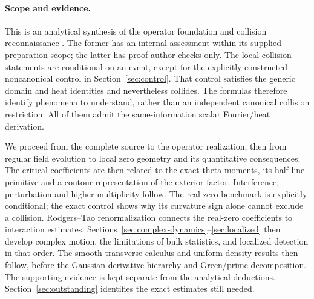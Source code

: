 \paragraph{Scope and evidence.}
This is an analytical synthesis of the operator foundation
\cite{OperatorProof,OperatorAssessment} and collision reconnaissance
\cite{OperatorCollision}. The former has an internal assessment within
its supplied-preparation scope; the latter has proof-author checks only.
The local collision statements are conditional on an event, except for
the explicitly constructed noncanonical control in Section~\ref{sec:control}.
That control satisfies the generic domain and heat identities and
nevertheless collides. The formulas therefore identify phenomena to
understand, rather than an independent canonical collision restriction.
All of them admit the same-information scalar Fourier/heat derivation.

We proceed from the complete source to the operator realization, then
from regular field evolution to local zero geometry and its quantitative
consequences. The critical coefficients are then related to the exact theta moments,
its half-line primitive and a contour representation of the exterior
factor. Interference, perturbation and higher multiplicity follow.
The real-zero benchmark is explicitly conditional; the exact control
shows why its curvature sign alone cannot exclude a collision.
Rodgers--Tao renormalization connects the real-zero coefficients to
interaction estimates. Sections~\ref{sec:complex-dynamics}--\ref{sec:localized}
then develop complex motion, the limitations of bulk statistics, and
localized detection in that order. The smooth transverse calculus and
uniform-density results then follow, before the Gaussian derivative
hierarchy and Green/prime decomposition.
The supporting evidence is kept separate from the analytical deductions. Section~\ref{sec:outstanding}
identifies the exact estimates still needed.
